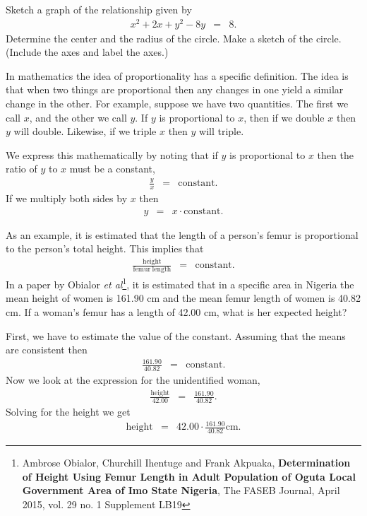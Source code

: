 \begin{problem}
  \clearpage

\item Sketch a graph of the relationship given by
  \begin{eqnarray*}
    x^2 + 2x + y^2 - 8y & = & 8.
  \end{eqnarray*}
  Determine the center and the radius of the circle.  Make a sketch of
  the circle. (Include the axes and label the axes.)  

  \vfill

  \clearpage

  In mathematics the idea of proportionality has a specific
  definition. The idea is that when two things are proportional then
  any changes in one yield a similar change in the other. For example,
  suppose we have two quantities. The first we call $x$, and the other
  we call $y$. If $y$ is proportional to $x$, then if we double $x$
  then $y$ will double. Likewise, if we triple $x$ then $y$ will
  triple.

  We express this mathematically by noting that if $y$ is proportional
  to $x$ then the ratio of $y$ to $x$ must be a constant,
  \begin{eqnarray*}
    \frac{y}{x} & = & \mathrm{constant}.
  \end{eqnarray*}
  If we multiply both sides by $x$ then
  \begin{eqnarray*}
    y & = & x \cdot \mathrm{constant}.
  \end{eqnarray*}

  As an example, it is estimated that the length of a person's femur
  is proportional to the person's total height. This implies that
  \begin{eqnarray*}
    \frac{\mathrm{height}}{\mathrm{femur ~ length}} & = & \mathrm{constant}.
  \end{eqnarray*}
  In a paper by Obialor \textit{et al}\footnote{Ambrose Obialor,
    Churchill Ihentuge and Frank Akpuaka, \textbf{Determination of
      Height Using Femur Length in Adult Population of Oguta Local
      Government Area of Imo State Nigeria}, The FASEB Journal, April
    2015, vol. 29 no. 1 Supplement LB19}, it is estimated that in a
  specific area in Nigeria the mean height of women is 161.90 cm and
  the mean femur length of women is 40.82 cm. If a woman's femur has a
  length of 42.00 cm, what is her expected height?

  First, we have to estimate the value of the constant. Assuming that
  the means are consistent then 
  \begin{eqnarray*}
    \frac{161.90}{40.82} & = & \mathrm{constant.}
  \end{eqnarray*}
  Now we look at the expression for the unidentified woman,
  \begin{eqnarray*}
    \frac{\mathrm{height}}{42.00} & = & \frac{161.90}{40.82}.
  \end{eqnarray*}
  Solving for the height we get
  \begin{eqnarray*}
    \mathrm{height} & = & 42.00\cdot\frac{161.90}{40.82} \mathrm{cm}.
  \end{eqnarray*}


\end{problem}
